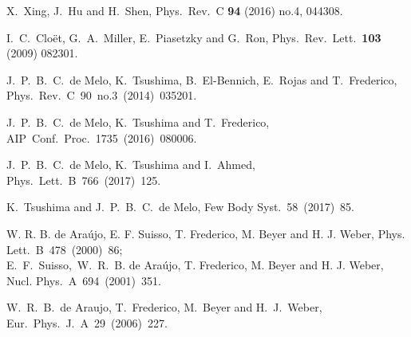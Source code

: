 \documentclass[preprint,aps,showpacs,floatfix]{revtex4}
\begin{document}
\begin{thebibliography}{99}
  X.~Xing, J.~Hu and H.~Shen,
  Phys.\ Rev.\ C {\bf 94} (2016) no.4,  044308. 

  I.~C.~Clo\"{e}t, G.~A.~Miller, E.~Piasetzky and G.~Ron,
  Phys.\ Rev.\ Lett.\  {\bf 103} (2009) 082301.
    
  
  
  J.~P.~B.~C.~de Melo, K.~Tsushima, B.~El-Bennich, E.~Rojas and T.~Frederico,
  Phys.\ Rev.\ C~90~no.3~(2014)~035201. %
  

  
  
  J.~P.~B.~C.~de Melo, K.~Tsushima and T.~Frederico,
  AIP~Conf.~Proc.~1735~(2016)~080006.  %
  
  J.~P.~B.~C.~de Melo, K.~Tsushima and I.~Ahmed,
  Phys.~Lett.~B~766~(2017)~125.  %
  
 
  K.~Tsushima and J.~P.~B.~C.~de Melo,
  Few Body Syst.~58~(2017)~85.  %
  
  
 W. R. B. de Ara\'ujo, E. F. Suisso, T. Frederico,
M. Beyer and H. J. Weber, Phys. Lett.~B~478~(2000)~86;\\
E.~F.~Suisso,~W.~R.~B. de Ara\'ujo, T. Frederico, M. Beyer and H. J.
Weber, Nucl. Phys.~A~694~(2001)~351.


  W.~R.~B.~de Araujo, T.~Frederico, M.~Beyer and H.~J.~Weber,
  Eur.\ Phys.\ J.\ A~29~(2006)~227.   %


\end{thebibliography}
\end{document}
